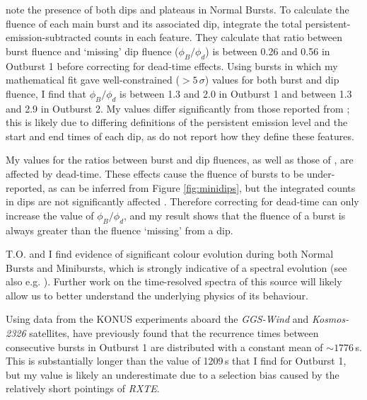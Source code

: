 \par \citet{Giles_BP} note the presence of both dips and plateaus in Normal Bursts.  To calculate the fluence of each main burst and its associated dip, \citeauthor{Giles_BP} integrate the total persistent-emission-subtracted counts in each feature.  They calculate that ratio between burst fluence and `missing' dip fluence ($\phi_{B}/\phi_{d}$) is between 0.26 and 0.56 in Outburst 1 before correcting for dead-time effects.  Using bursts in which my mathematical fit gave well-constrained ($>5\,\sigma$) values for both burst and dip fluence, I find that $\phi_{B}/\phi_{d}$ is between 1.3 and 2.0 in Outburst 1 and between 1.3 and 2.9 in Outburst 2.  My values differ significantly from those reported from \citeauthor{Giles_BP}; this is likely due to differing definitions of the persistent emission level and the start and end times of each dip, as \citeauthor{Giles_BP} do not report how they define these features.
\par My values for the ratios between burst and dip fluences, as well as those of \citeauthor{Giles_BP}, are affected by dead-time.  These effects cause the fluence of bursts to be under-reported, as can be inferred from Figure \ref{fig:minidips}, but the integrated counts in dips are not significantly affected \citep{Giles_BP}.  Therefore correcting for dead-time can only increase the value of $\phi_{B}/\phi_{d}$, and my result shows that the fluence of a burst is always greater than the fluence `missing' from a dip.
\par \textsf{T.O.} and I find evidence of significant colour evolution during both Normal Bursts and Minibursts, which is strongly indicative of a spectral evolution (see also e.g. \citealp{Woods_OB2}).  Further work on the time-resolved spectra of this source will likely allow us to better understand the underlying physics of its behaviour.
\par Using data from the KONUS experiments aboard the \textit{GGS-Wind} and \textit{Kosmos-2326} satellites, \citet{Aptekar_Recur} have previously found that the recurrence times between consecutive bursts in Outburst 1 are distributed with a constant mean of $\sim1776$\,s.  This is substantially longer than the value of 1209\,s that I find for Outburst 1, but my value is likely an underestimate due to a selection bias caused by the relatively short pointings of \indexrxte\textit{RXTE}.
